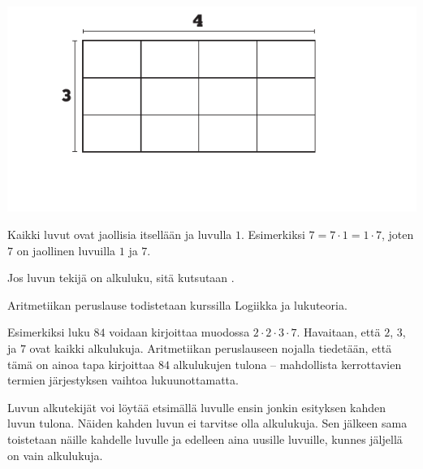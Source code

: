 \begin{center}
\includegraphics[scale=0.85]{pictures/Kuva2-4-3x4.pdf}
\end{center}
    
Kaikki luvut ovat jaollisia itsellään ja luvulla $1$. Esimerkiksi $7=7 \cdot 1=1 \cdot 7$, joten $7$ on jaollinen luvuilla $1$ ja $7$.
    


\begin{esimerkki}
\end{esimerkki}

Jos luvun tekijä on alkuluku, sitä kutsutaan .

% 	


Aritmetiikan peruslause todistetaan kurssilla Logiikka ja lukuteoria.
    
Esimerkiksi luku $84$ voidaan kirjoittaa muodossa $2\cdot 2\cdot 3\cdot 7$. Havaitaan, että $2$, $3$, ja $7$ ovat kaikki alkulukuja. Aritmetiikan peruslauseen nojalla tiedetään, että tämä on ainoa tapa kirjoittaa $84$ alkulukujen tulona -- mahdollista kerrottavien termien järjestyksen vaihtoa lukuunottamatta.
    
Luvun alkutekijät voi löytää etsimällä luvulle ensin jonkin esityksen kahden luvun tulona. Näiden kahden luvun ei tarvitse olla alkulukuja. Sen jälkeen sama toistetaan näille kahdelle luvulle ja edelleen aina uusille luvuille, kunnes jäljellä on vain alkulukuja.

% 	


